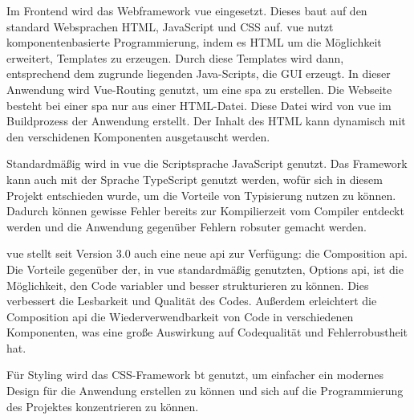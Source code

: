 \documentclass[11pt]{article}
\begin{document}

Im Frontend wird das Webframework \Gls{vue} eingesetzt. Dieses baut auf den
standard Websprachen HTML, JavaScript und CSS auf. 
\Gls{vue} nutzt komponentenbasierte Programmierung, indem es HTML um die Möglichkeit
erweitert, Templates zu erzeugen. Durch diese Templates wird dann, entsprechend dem zugrunde 
liegenden Java-Scripts, die GUI erzeugt. %
In dieser Anwendung wird Vue-Routing genutzt, um eine \gls{spa} zu
erstellen. Die Webseite besteht bei einer \gls{spa} nur aus einer HTML-Datei. Diese Datei
wird von \Gls{vue} im Buildprozess der Anwendung erstellt. Der Inhalt des HTML kann dynamisch mit den
verschidenen Komponenten ausgetauscht werden.

Standardmäßig wird in \Gls{vue} die Scriptsprache JavaScript genutzt. Das Framework
kann auch mit der Sprache TypeScript genutzt werden, wofür sich in diesem
Projekt entschieden wurde, um die Vorteile von Typisierung nutzen zu können.
Dadurch können gewisse Fehler bereits zur Kompilierzeit vom Compiler entdeckt werden und
die Anwendung gegenüber Fehlern robsuter gemacht werden.

\Gls{vue} stellt seit Version 3.0 auch eine neue \gls{api} zur Verfügung: die Composition \Gls{api}.
Die Vorteile gegenüber der, in \Gls{vue} standardmäßig genutzten, Options \Gls{api}, ist die Möglichkeit,
den Code variabler und besser strukturieren zu können. Dies verbessert die Lesbarkeit und Qualität des
Codes. Außerdem erleichtert die Composition \Gls{api} die Wiederverwendbarkeit
von Code in verschiedenen Komponenten, was eine große Auswirkung auf Codequalität und
Fehlerrobustheit hat.

Für Styling wird das CSS-Framework \gls{bt} genutzt, um einfacher ein modernes
Design für die Anwendung erstellen zu können und sich auf die Programmierung des
Projektes konzentrieren zu können.\newline

\end{document}
